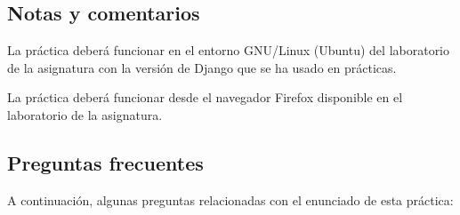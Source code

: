 \subsection{Notas y comentarios}

La práctica deberá funcionar en el entorno GNU/Linux (Ubuntu) del laboratorio de la asignatura con la versión de Django que se ha usado en prácticas.

La práctica deberá funcionar desde el navegador Firefox disponible en el laboratorio de la asignatura.

\subsection{Preguntas frecuentes}
\label{sec:practica-2026-05-ltaw:preguntas}

A continuación, algunas preguntas relacionadas con el enunciado de esta práctica:

